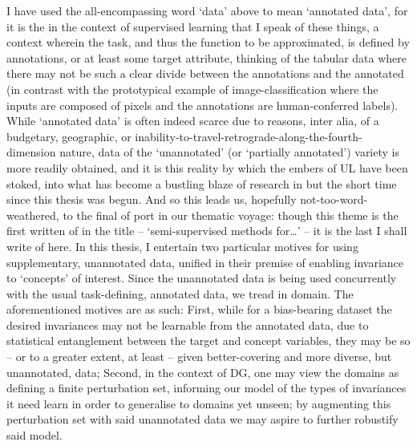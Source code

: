 %
%
I have used the all-encompassing word `data' above to mean `annotated data', for it is the in the
context of supervised learning that I speak of these things, a context wherein the task, and thus
the function to be approximated, is defined by annotations, or at least some target attribute,
thinking of the tabular data where there may not be such a clear divide between the annotations and
the annotated (in contrast with the prototypical example of image-classification where the inputs
are composed of pixels and the annotations are human-conferred labels).
%
While `annotated data' is often indeed scarce due to reasons, inter alia, of a budgetary,
geographic, or inability-to-travel-retrograde-along-the-fourth-dimension nature, data of the
`unannotated' (or `partially annotated') variety is more readily obtained, and it is this reality
by which the embers of \acf{UL} have been stoked, into what has become a bustling blaze of
research in but the short time since this thesis was begun.
%
And so this leads us, hopefully not-too-word-weathered, to the final of port in our thematic
voyage: though this theme is the first written of in the title -- `semi-supervised methods
for\dots' -- it is the last I shall write of here.
%
In this thesis, I entertain two particular motives for using supplementary, unannotated data,
unified in their premise of enabling invariance to `concepts' of interest.
%
Since the unannotated data is being used concurrently with the usual task-defining, annotated data,
we tread in  domain.
%
The aforementioned motives are as such:
%
First, while for a bias-bearing dataset the desired invariances may not be learnable from the
annotated data, due to statistical entanglement between the target and concept variables, they may
be so -- or to a greater extent, at least -- given better-covering and more diverse, but
unannotated, data;
%
Second, in the context of \ac{DG}, one may view the domains as defining a finite perturbation set,
informing our model of the types of invariances it need learn in order to generalise to domains yet
unseen; by augmenting this perturbation set with said unannotated data we may aspire to further
robustify said model.

%

